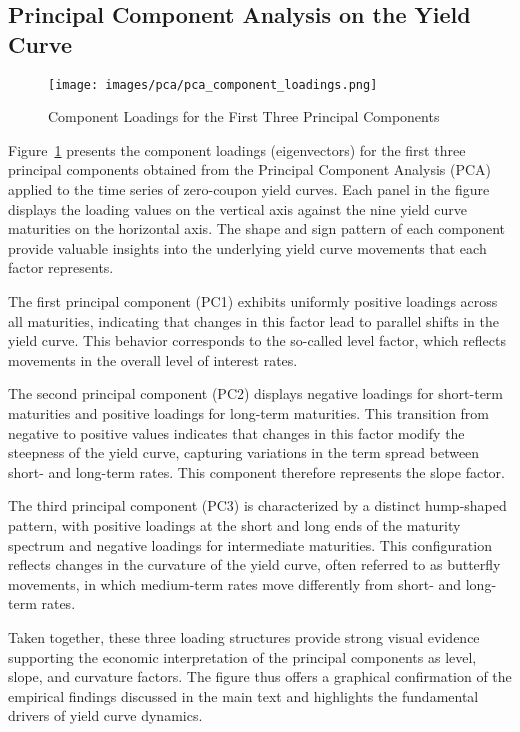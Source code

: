 \subsection{Principal Component Analysis on the Yield Curve}
\begin{figure}[H]
	\centering
	\texttt{[image: images/pca/pca\_component\_loadings.png]}
	\caption{Component Loadings for the First Three Principal Components}
	\label{fig:pca_loadings}
\end{figure}

Figure~\ref{fig:pca_loadings} presents the component loadings (eigenvectors) for the first three principal components obtained from the Principal Component Analysis (PCA) applied to the time series of zero-coupon yield curves. Each panel in the figure displays the loading values on the vertical axis against the nine yield curve maturities on the horizontal axis. The shape and sign pattern of each component provide valuable insights into the underlying yield curve movements that each factor represents.

The first principal component (PC1) exhibits uniformly positive loadings across all maturities, indicating that changes in this factor lead to parallel shifts in the yield curve. This behavior corresponds to the so-called level factor, which reflects movements in the overall level of interest rates.

The second principal component (PC2) displays negative loadings for short-term maturities and positive loadings for long-term maturities. This transition from negative to positive values indicates that changes in this factor modify the steepness of the yield curve, capturing variations in the term spread between short- and long-term rates. This component therefore represents the slope factor.

The third principal component (PC3) is characterized by a distinct hump-shaped pattern, with positive loadings at the short and long ends of the maturity spectrum and negative loadings for intermediate maturities. This configuration reflects changes in the curvature of the yield curve, often referred to as butterfly movements, in which medium-term rates move differently from short- and long-term rates.

Taken together, these three loading structures provide strong visual evidence supporting the economic interpretation of the principal components as level, slope, and curvature factors. The figure thus offers a graphical confirmation of the empirical findings discussed in the main text and highlights the fundamental drivers of yield curve dynamics.

